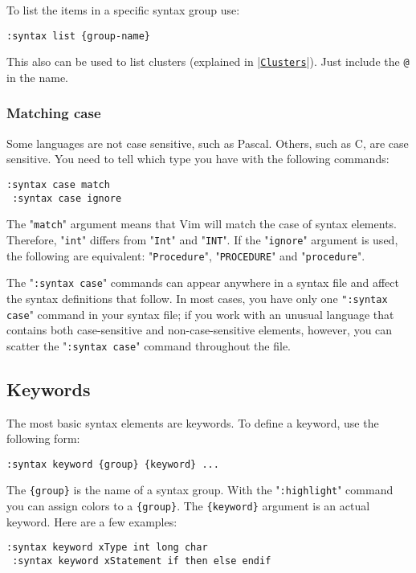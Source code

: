 To list the items in a specific syntax group use:

\begin{Verbatim}[samepage=true]
 :syntax list {group-name}
\end{Verbatim}

This also can be used to list clusters (explained in |\hyperref[Clusters]{\texttt{Clusters}}|).
Just include the \texttt{@} in the name.

\subsubsection{Matching case}
Some languages are not case sensitive, such as Pascal.
Others, such as C, are case sensitive.
You need to tell which type you have with the following commands:

\begin{Verbatim}[samepage=true]
 :syntax case match
 :syntax case ignore
\end{Verbatim}

The "\texttt{match}" argument means that Vim will match the case of syntax elements.
Therefore, "\texttt{int}" differs from "\texttt{Int}" and "\texttt{INT}".
If the "\texttt{ignore}" argument is used, the following are equivalent: "\texttt{Procedure}", "\texttt{PROCEDURE}" and "\texttt{procedure}".

The "\texttt{:syntax case}" commands can appear anywhere in a syntax file and affect the syntax definitions that follow.
In most cases, you have only one \texttt{":syntax case}" command in your syntax file; if you work with an unusual language that contains both case-sensitive and non-case-sensitive elements, however, you can scatter the "\texttt{:syntax case}" command throughout the file.
\subsection{Keywords}
The most basic syntax elements are keywords.
To define a keyword, use the following form:

\begin{Verbatim}[samepage=true]
 :syntax keyword {group} {keyword} ...
\end{Verbatim}

The \texttt{\{group\}} is the name of a syntax group.
With the "\texttt{:highlight}" command you can assign colors to a \texttt{\{group\}}.
The \texttt{\{keyword\}} argument is an actual keyword.
Here are a few examples:

\begin{Verbatim}[samepage=true]
 :syntax keyword xType int long char
 :syntax keyword xStatement if then else endif
\end{Verbatim}

